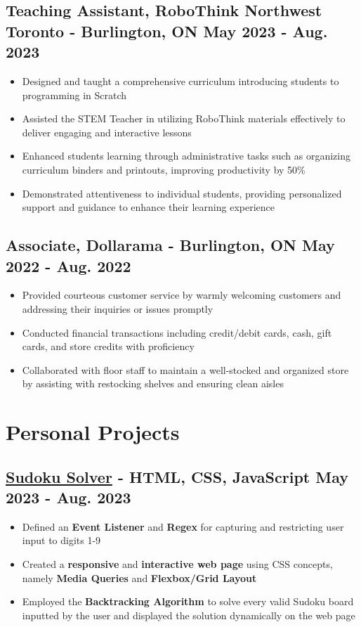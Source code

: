 \documentclass[10pt]{article}
\newcommand{\rightindent}[1]{\hfill{\textmd{#1}}}
\newcommand{\job}[3]{
    #1,  %
    \textmd{#2} %
    \hfill{\textmd{#3}} %
}
\begin{document}
\subsection{\job{Teaching Assistant}{RoboThink Northwest Toronto - Burlington, ON}{May 2023 - Aug. 2023}}
\begin{itemize}
    \item Designed and taught a comprehensive curriculum introducing students to programming in Scratch 
    \item Assisted the STEM Teacher in utilizing RoboThink materials effectively to deliver engaging and interactive lessons
    \item Enhanced students learning through administrative tasks such as organizing curriculum binders and printouts, improving productivity by 50\%
    \item Demonstrated attentiveness to individual students, providing personalized support and guidance to enhance their learning experience
\end{itemize}
\subsection{\job{Associate}{Dollarama - Burlington, ON}{May 2022 - Aug. 2022}}
\begin{itemize} 
    \item Provided courteous customer service by warmly welcoming customers and addressing their inquiries or issues promptly
    \item Conducted financial transactions including credit/debit cards, cash, gift cards, and store credits with proficiency
    \item Collaborated with floor staff to maintain a well-stocked and organized store by assisting with restocking shelves and ensuring clean aisles
\end{itemize}

\section{Personal Projects}
\subsection{\href{https://nicholas489.github.io/Sudoku_Solver/}{Sudoku Solver} \textmd{- HTML, CSS, JavaScript} \rightindent{May 2023 - Aug. 2023}}
\begin{itemize}
    \item Defined an \textbf{Event Listener} and \textbf{Regex} for capturing and restricting user input to digits 1-9
    \item Created a \textbf{responsive} and \textbf{interactive web page} using CSS concepts, namely \textbf{Media Queries} and \textbf{Flexbox/Grid Layout}
    \item Employed the \textbf{Backtracking Algorithm} to solve every valid Sudoku board inputted by the user and displayed the solution dynamically on the web page
\end{itemize}
\end{document}
